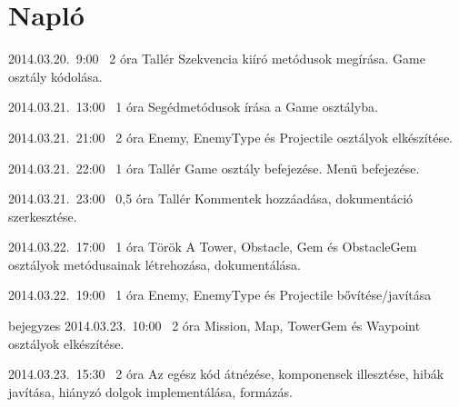 %
\section{Napló}

\begin{naplo}

\bejegyzes
{2014.03.20.~9:00~} %
{2 óra} %
{Tallér} %
{Szekvencia kiíró metódusok megírása. Game osztály kódolása.}

\bejegyzes
{2014.03.21.~13:00~}
{1 óra}
{\vantal}
{Segédmetódusok írása a Game osztályba.}

\bejegyzes
{2014.03.21.~21:00~}
{2 óra}
{\vantal}
{Enemy, EnemyType és Projectile osztályok elkészítése.}

\bejegyzes
{2014.03.21.~22:00~} %
{1 óra} %
{Tallér} %
{Game osztály befejezése. Menü befejezése.}

\bejegyzes
{2014.03.21.~23:00~} %
{0,5 óra} %
{Tallér} %
{Kommentek hozzáadása, dokumentáció szerkesztése.}

\bejegyzes
{2014.03.22.~17:00~} %
{1 óra} %
{Török} %
{A Tower, Obstacle, Gem és ObstacleGem osztályok metódusainak létrehozása, dokumentálása.}

\bejegyzes
{2014.03.22.~19:00~}
{1 óra}
{\vantal}
{Enemy, EnemyType és Projectile bővítése/javítása}

bejegyzes
{2014.03.23.~10:00~}
{2 óra}
{\vadam}
{Mission, Map, TowerGem és Waypoint osztályok elkészítése.}

\bejegyzes
{2014.03.23.~15:30~}
{2 óra}
{\vantal}
{Az egész kód átnézése, komponensek illesztése, hibák javítása, hiányzó dolgok implementálása, formázás.}


\end{naplo}

